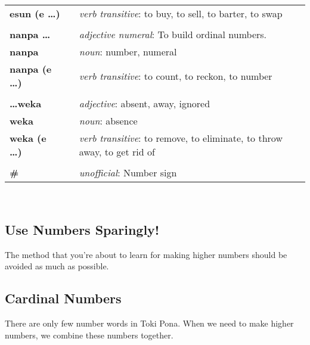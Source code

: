 \begin{supertabular}{p{2,5cm}|ll}
\textbf{esun (e \dots)} && \textit{verb transitive}: to buy, to sell, to barter, to swap \\ %
 && \\ %
%
\textbf{nanpa \dots} && \textit{adjective numeral}: To build ordinal numbers. \\ %
\textbf{nanpa} && \textit{noun}: number, numeral \\ %
\textbf{nanpa (e \dots)} && \textit{verb transitive}: to count, to reckon,  to number \\ %
 && \\ %
%
\textbf{\dots weka} && \textit{adjective}: absent, away, ignored \\ %
\textbf{weka} && \textit{noun}: absence \\ %
\textbf{weka (e \dots)} && \textit{verb transitive}: to remove, to eliminate, to throw away, to get rid of \\ %
 && \\ %
%
\index{\#}
\textbf{\#} && \textit{unofficial}: Number sign  \\ %
%
\end{supertabular} \\
%
%
%
%
\subsection*{Use Numbers Sparingly!}
%
\newpage
%
The method that you're about to learn for making higher numbers should be avoided as much as possible. 
%

\subsection*{Cardinal Numbers}
%
There are only few number words in Toki Pona.
When we need to make higher numbers, we combine these numbers together. 

